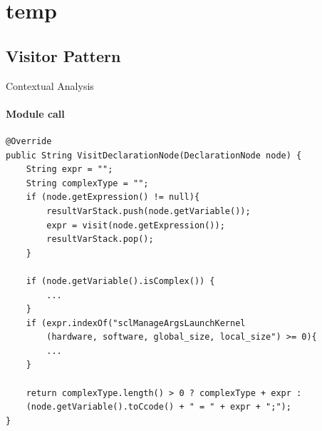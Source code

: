\section{temp}
\subsection{Visitor Pattern}

\begin{frame}[fragile]{Contextual Analysis}
\framesubtitle{Module call}



\begin{lstlisting}[caption=The visit method for visiting a DeclarationNode in the code generator. ,frame=tlrb,label={lst:DeclarationNodeCodeGen}]
@Override
public String VisitDeclarationNode(DeclarationNode node) {
    String expr = "";
    String complexType = "";
    if (node.getExpression() != null){
        resultVarStack.push(node.getVariable());
        expr = visit(node.getExpression());
        resultVarStack.pop();
    }

    if (node.getVariable().isComplex()) {
        ...
    }
    if (expr.indexOf("sclManageArgsLaunchKernel
    	(hardware, software, global_size, local_size") >= 0){
        ...
    }

    return complexType.length() > 0 ? complexType + expr :
    (node.getVariable().toCcode() + " = " + expr + ";");
}
\end{lstlisting}
\end{frame}